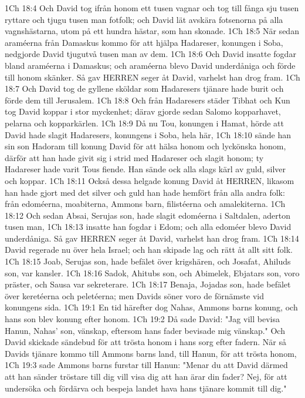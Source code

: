 1Ch 18:4  Och David tog ifrån honom ett tusen vagnar och tog till fånga sju tusen ryttare och tjugu tusen man fotfolk; och David lät avskära fotsenorna på alla vagnshästarna, utom på ett hundra hästar, som han skonade.
1Ch 18:5  När sedan araméerna från Damaskus kommo för att hjälpa Hadareser, konungen i Soba, nedgjorde David tjugutvå tusen man av dem.
1Ch 18:6  Och David insatte fogdar bland araméerna i Damaskus; och araméerna blevo David underdåniga och förde till honom skänker. Så gav HERREN seger åt David, varhelst han drog fram.
1Ch 18:7  Och David tog de gyllene sköldar som Hadaresers tjänare hade burit och förde dem till Jerusalem.
1Ch 18:8  Och från Hadaresers städer Tibhat och Kun tog David koppar i stor myckenhet; därav gjorde sedan Salomo kopparhavet, pelarna och kopparkärlen.
1Ch 18:9  Då nu Tou, konungen i Hamat, hörde att David hade slagit Hadaresers, konungens i Soba, hela här,
1Ch 18:10  sände han sin son Hadoram till konung David för att hälsa honom och lyckönska honom, därför att han hade givit sig i strid med Hadareser och slagit honom; ty Hadareser hade varit Tous fiende. Han sände ock alla slags kärl av guld, silver och koppar.
1Ch 18:11  Också dessa helgade konung David åt HERREN, likasom han hade gjort med det silver och guld han hade hemfört från alla andra folk: från edoméerna, moabiterna, Ammons barn, filistéerna och amalekiterna.
1Ch 18:12  Och sedan Absai, Serujas son, hade slagit edoméerna i Saltdalen, aderton tusen man,
1Ch 18:13  insatte han fogdar i Edom; och alla edoméer blevo David underdåniga. Så gav HERREN seger åt David, varhelst han drog fram.
1Ch 18:14  David regerade nu över hela Israel; och han skipade lag och rätt åt allt sitt folk.
1Ch 18:15  Joab, Serujas son, hade befälet över krigshären, och Josafat, Ahiluds son, var kansler.
1Ch 18:16  Sadok, Ahitubs son, och Abimelek, Ebjatars son, voro präster, och Sausa var sekreterare.
1Ch 18:17  Benaja, Jojadas son, hade befälet över keretéerna och peletéerna; men Davids söner voro de förnämste vid konungens sida.
1Ch 19:1  En tid härefter dog Nahas, Ammons barns konung, och hans son blev konung efter honom.
1Ch 19:2  Då sade David: "Jag vill bevisa Hanun, Nahas' son, vänskap, eftersom hans fader bevisade mig vänskap." Och David skickade sändebud för att trösta honom i hans sorg efter fadern. När så Davids tjänare kommo till Ammons barns land, till Hanun, för att trösta honom,
1Ch 19:3  sade Ammons barns furstar till Hanun: "Menar du att David därmed att han sänder tröstare till dig vill visa dig att han ärar din fader? Nej, för att undersöka och fördärva och bespeja landet hava hans tjänare kommit till dig."
